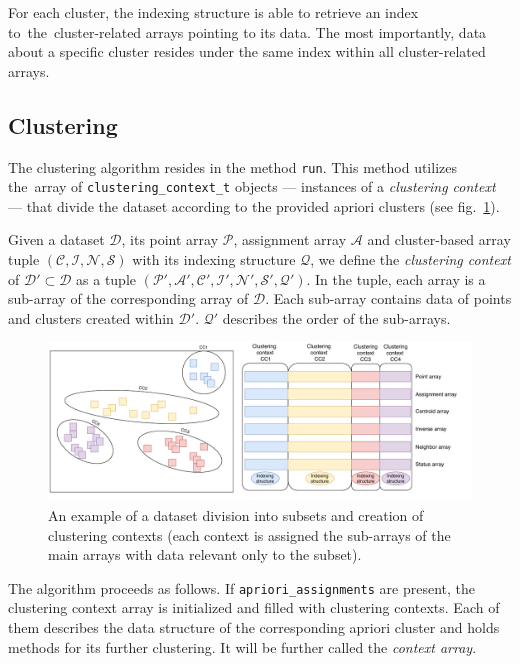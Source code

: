 For each cluster, the indexing structure is able to retrieve an index to~the~clus\-ter-related arrays pointing to its data. The most importantly, data about a specific cluster resides under the same index within all cluster-related arrays.



\subsection{Clustering}
The clustering algorithm resides in the method \texttt{run}. This method utilizes the~array of \texttt{clustering\_context\_t} objects --- instances of a \emph{clustering context} --- that divide the dataset according to the provided apriori clusters (see fig.~\ref{fig03:clust_ctx}).

\begin{defn}
	Given a dataset $\mathcal{D}$, its point array $\mathcal{P}$, assignment array $\mathcal{A}$ and cluster-based array tuple $(\mathcal{C},\mathcal{I},\mathcal{N},\mathcal{S})$ with its indexing structure $\mathcal{Q}$, we define the \emph{clustering context} of $\mathcal{D}' \subset \mathcal{D}$ as a tuple $(\mathcal{P'},\mathcal{A'},\mathcal{C'},\mathcal{I'},\mathcal{N'},\mathcal{S'},\mathcal{Q}')$. In the tuple, each array is a sub-array of the corresponding array of $\mathcal{D}$. Each sub-array contains data of points and clusters created within $\mathcal{D}'$. $\mathcal{Q}'$ describes the order of the sub-arrays.
	\label{def03:context}
\end{defn}

\begin{figure}\centering
	\includegraphics[width=\linewidth]{img/clustering_context}
	\caption{An example of a dataset division into subsets and creation of clustering contexts (each context is assigned the sub-arrays of the main arrays with data relevant only to the subset).}
	\label{fig03:clust_ctx}
\end{figure}

The algorithm proceeds as follows.
If \texttt{apriori\_assignments} are present, the clustering context array is initialized and filled with clustering contexts. Each of them describes the data structure of the corresponding apriori cluster and holds methods for its further clustering. It will be further called the \emph{context array}. 

